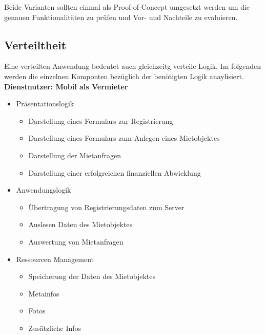 Beide Varianten sollten einmal als Proof-of-Concept umgesetzt werden um die genauen Funktionalitäten zu prüfen und Vor- und Nachteile zu evaluieren.

\subsection{Verteiltheit}

Eine verteilten Anwendung bedeutet auch gleichzeitg verteile Logik. Im folgenden werden die einzelnen Komponten bezüglich der benötigten Logik anaylisiert.\\

\textbf{Dienstnutzer: Mobil als Vermieter}
\begin{itemize}
	\item Präsentationslogik
	\begin{itemize}
  		\item Darstellung eines Formulars zur Registrierung
  		\item Darstellung eines Formulars zum Anlegen eines Mietobjektes
  		\item Darstellung der Mietanfragen
  		\item Darstellung einer erfolgreichen finanziellen Abwicklung
    \end{itemize}
	\item Anwendungslogik
	\begin{itemize}
  		\item Übertragung von Registrierungsdaten zum Server
  		\item Auslesen Daten des Mietobjektes
  		\item Auswertung von Mietanfragen
    \end{itemize}
	\item Ressourcen Management
	\begin{itemize}
  		\item Speicherung der Daten des Mietobjektes
		\item Metainfos
		\item Fotos
		\item Zusätzliche Infos
	\end{itemize}
\end{itemize}


